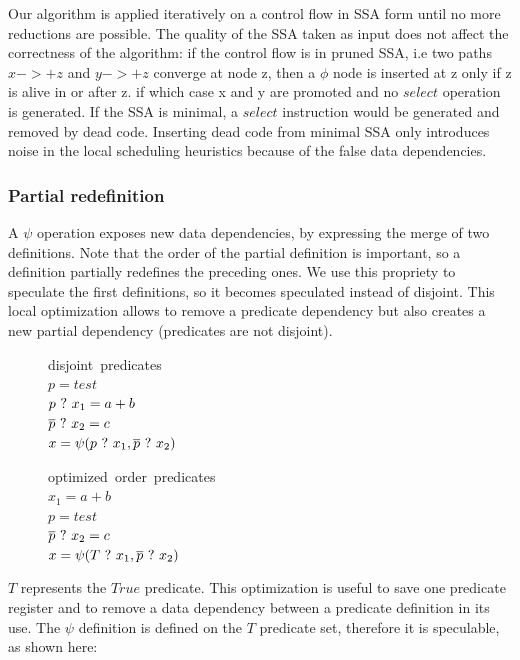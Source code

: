Our algorithm is applied iteratively on a control flow in SSA form until no more reductions are possible. The quality of the SSA taken as input does not affect the correctness of the algorithm: if the control flow is in pruned SSA, i.e two paths $x->+z$ and $y->+z$ converge at node z, then a $\phi$ node is inserted at z only if z is alive in or after z. if which case x and y are promoted and no $select$ operation is generated. If the SSA is minimal, a $select$ instruction would be generated and removed by dead code. Inserting dead code from minimal SSA only introduces noise in the local scheduling heuristics because of the false data dependencies.

\subsubsection{Partial redefinition}

A $\psi$ operation exposes new data dependencies, by expressing the merge of two definitions. Note that the order of the partial definition is important, so a definition partially redefines the preceding ones. We use this propriety to speculate the first definitions, so it becomes speculated instead of disjoint. This local optimization allows to remove a predicate dependency but also creates a new partial dependency (predicates are not disjoint). 

\begin{figure}
\footnotesize
\begin{minipage}[t]{4cm}
\mbox{disjoint predicates} \\
$ p = test $ \\
$ p ~?~ x_1 = a + b $ \\
$ \overline{p} ~?~ x_2 = c $ \\
$ x = \psi(p ~?~ x_1, \overline{p} ~?~ x_2) $ \\
\end{minipage}
\begin{minipage}[t]{4cm}
\mbox{optimized order predicates} \\
$ x_1 = a + b $ \\
$ p = test $ \\
$ \overline{p} ~?~ x_2 = c $ \\
$ x = \psi(T ~?~ x_1, \overline{p} ~?~ x_2) $ \\
\end{minipage}
\end{figure}

$T$ represents the $True$ predicate. This optimization is useful to save one predicate register and to remove a data dependency between a predicate definition in its use. 
The $\psi$ definition is defined on the $T$ predicate set, therefore it is speculable, as shown here:

